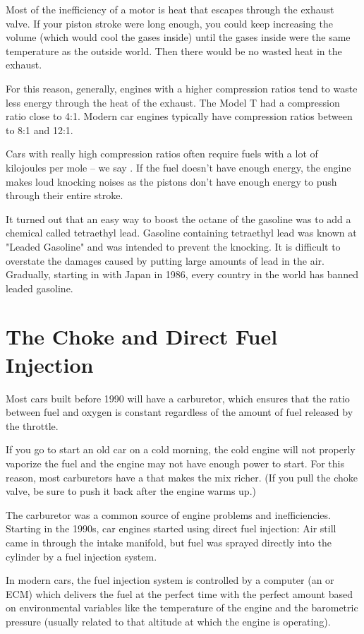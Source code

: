 Most of the inefficiency of a motor is heat that escapes through the exhaust valve.  If your piston stroke were long enough,  you could keep increasing the volume (which would cool the gases inside) until the gases inside were the same temperature as the outside world.  Then there would be no wasted heat in the exhaust.

For this reason, generally,  engines with a higher compression ratios tend to waste less energy through the heat of the exhaust.  The Model T had a compression ratio close to 4:1.  Modern car engines typically have compression ratios between to 8:1 and 12:1.  

Cars with really high compression ratios often require fuels with a lot of kilojoules per mole -- we say .   If the fuel doesn't have enough energy,  the engine makes loud knocking noises as the pistons don't have enough energy to push through their entire stroke.

It turned out that an easy way to boost the octane of the gasoline was to add a chemical called tetraethyl lead.  Gasoline containing tetraethyl lead was known at "Leaded Gasoline" and was intended to prevent the knocking.   It is difficult to overstate the damages caused by putting large amounts of lead in the air.  Gradually, starting in with Japan in 1986, every country in the world has banned leaded gasoline.

\section{The Choke and Direct Fuel Injection}

Most cars built before 1990 will have a carburetor,  which ensures that the ratio between fuel and oxygen is constant regardless of the amount of fuel released by the throttle.   

If you go to start an old car on a cold morning,  the cold engine will not properly vaporize the fuel and the engine may not have enough power to start.   For this reason,  most carburetors have a  that makes the mix richer.  (If you pull the choke valve,  be sure to push it back after the engine warms up.)

The carburetor was a common source of engine problems and inefficiencies.   Starting in the 1990s,  car engines started using direct fuel injection:  Air still came in through the intake manifold,  but fuel was sprayed directly into the cylinder by a fuel injection system.

In modern cars,  the fuel injection system is controlled by a computer (an   or ECM) which delivers the fuel at the perfect time with the perfect amount based on environmental variables like the temperature of the engine and the barometric pressure (usually related to that altitude at which the engine is operating).


